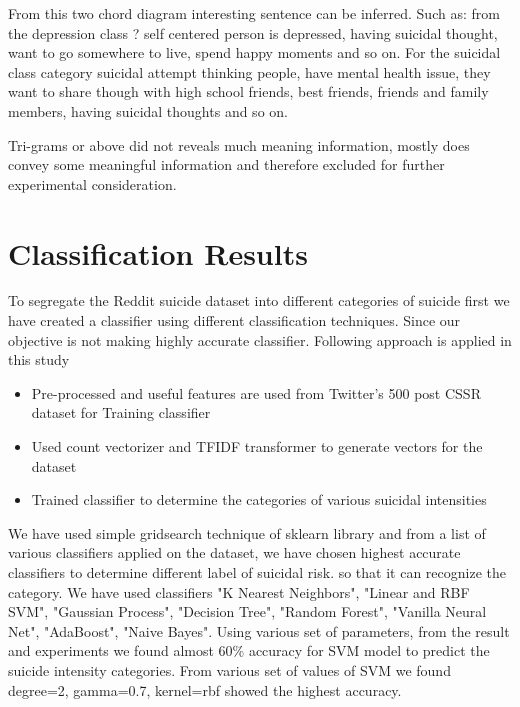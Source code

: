 \documentclass[sn-mathphys,Numbered]{sn-jnl}%
\theoremstyle{thmstyleone}%
\theoremstyle{thmstyletwo}%
\theoremstyle{thmstylethree}%
\begin{document}
From this two chord diagram interesting sentence can be inferred. Such as: from the depression class ? self centered person is depressed, having suicidal thought, want to go somewhere to live, spend happy moments and so on. For the suicidal class category suicidal attempt thinking people, have mental health issue, they want to share though with high school friends, best friends, friends and family members, having suicidal thoughts and so on.  

Tri-grams or above did not reveals much meaning information, mostly does convey some meaningful information and therefore excluded for further experimental consideration. 

\section{Classification Results}
To segregate the Reddit suicide dataset into different categories of suicide first we have created a classifier using different classification techniques. Since our objective is not making highly accurate classifier. Following approach is applied in this study

\begin{itemize}
\item Pre-processed and useful features are used from Twitter's 500 post CSSR dataset for Training classifier
\item Used count vectorizer and TFIDF transformer to generate vectors for the dataset
\item Trained classifier to determine the categories of various suicidal intensities
\end{itemize}

We have used simple gridsearch technique of sklearn library and from a list of various classifiers applied on the dataset, we have chosen highest accurate classifiers to determine different label of suicidal risk. so that it can recognize the category. We have used classifiers "K Nearest Neighbors", "Linear and RBF SVM", "Gaussian Process", "Decision Tree", "Random Forest", "Vanilla Neural Net", "AdaBoost", "Naive Bayes". Using various set of parameters, from the result and experiments we found almost 60\% accuracy for SVM model to predict the suicide intensity categories. From various set of values of SVM we found degree=2, gamma=0.7, kernel=rbf showed the highest accuracy. 
\end{document}
